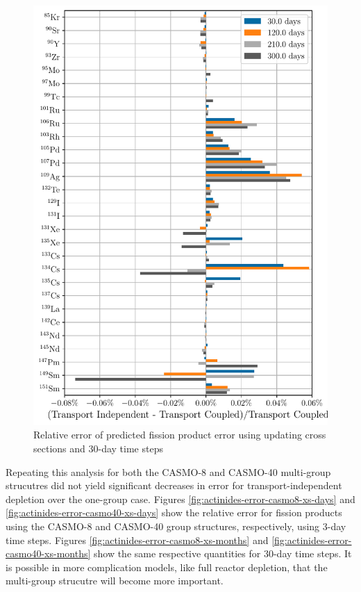     \begin{figure}[htpb]
        \centering
        \includegraphics[width=\linewidth]{figs/fission_products_updating_xs_predictor_fission_q_months.pdf}
        \caption{Relative error of predicted fission product error using
        updating cross sections and 30-day time steps}
        \label{fig:fp-error-updating-xs-months}
    \end{figure}

    Repeating this analysis for both the CASMO-8 and CASMO-40 multi-group
    strucutres did not yield significant decreases in error for
    transport-independent depletion over the one-group case.  Figures
    \ref{fig:actinides-error-casmo8-xs-days} and
    \ref{fig:actinides-error-casmo40-xs-days} show the relative error for
    fission products using the CASMO-8 and CASMO-40 group structures,
    respectively, using 3-day time steps. Figures
    \ref{fig:actinides-error-casmo8-xs-months} and
    \ref{fig:actinides-error-casmo40-xs-months} show the same respective
    quantities for 30-day time steps.  It is possible in more complication
    models, like full reactor depletion, that the multi-group strucutre will
    become more important. 

